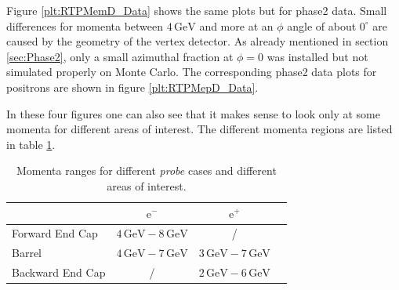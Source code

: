 \documentclass[a4paper,11pt,twosided,final,german,openbib,pdftex,listof=totoc,bibliography=totoc]{scrbook}
\begin{document}
 Figure \ref{plt:RTPMemD_Data} shows the same plots but for phase2 data. Small differences for momenta between $4\,\textrm{GeV}$ and more at an $\phi$ angle of about $0^\circ$ are caused by the geometry of the vertex detector. As already mentioned in section \ref{sec:Phase2}, only a small azimuthal fraction at $\phi =0$ was installed but not simulated properly on Monte Carlo. 
 The corresponding phase2 data plots for positrons are shown in figure \ref{plt:RTPMepD_Data}.  

In these four figures one can also see that it makes sense to look only at some momenta for different areas of interest. The different momenta regions are listed in table \ref{tab:RTPMDTable}.


\begin{table}[h!]
	\centering
	\begin{tabular}{lccc}
		&$\textrm{e}^-$ &$\textrm{e}^+$\\
		\hline
		Forward End Cap &$4\,\textrm{GeV} - 8\,\textrm{GeV}$&/\\
		Barrel &$4\,\textrm{GeV} - 7\,\textrm{GeV}$&$3\,\textrm{GeV} - 7\,\textrm{GeV}$\\
		Backward End Cap & /&$2\,\textrm{GeV} - 6\,\textrm{GeV}$\\	
	\end{tabular}
	
	\caption[Areas Of Interest Different Momenta Ranges]{Momenta ranges for different \textit{probe} cases and different areas of interest.}
	\label{tab:RTPMDTable}
\end{table}
\end{document}
